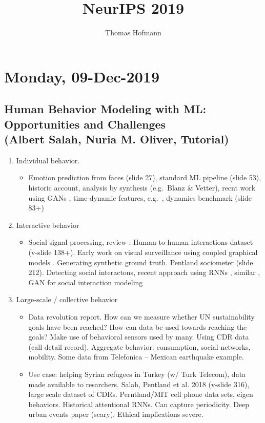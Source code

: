 \documentclass[12pt,a4paper]{article}
\author{Thomas Hofmann}
\title{NeurIPS 2019}
\begin{document}
\maketitle

\section{Monday, 09-Dec-2019}

\subsection{Human Behavior Modeling with ML: Opportunities and Challenges \\ (Albert Salah, Nuria M. Oliver, Tutorial)}
\begin{enumerate}
\item Individual behavior. 
\begin{itemize}
\item Emotion prediction from faces (slide 27), standard ML pipeline (slide 53), historic account,  analysis by synthesis (e.g.~Blanz \& Vetter), recnt work using GANs \cite{ding2018exprgan}, time-dynamic features, e.g.~\cite{otberdout2019automatic}, dynamics benchmark (slide 83+)
\end{itemize}
\item Interactive behavior 
\begin{itemize}
\item Social signal processing, review \cite{vinciarelli2009social}. Human-to-human interactions dataset (v-slide 138+). Early work on visual surveillance using coupled graphical models \cite{oliver2000bayesian}. Generating synthetic ground truth. Pentland sociometer (slide 212). Detecting social interactons, recent approach using RNNs \cite{deng2016structure}, similar \cite{ibrahim2016hierarchical}, GAN for social interaction modeling \cite{gupta2018social} 
\end{itemize}
\item Large-scale / collective behavior 
\begin{itemize}
\item Data revolution report. How can we measure whether UN sustainability goals have been reached? How can data be used towards reaching the goals? Make use of behavioral sensors used by many. Using CDR data (call detail record). Aggregate behavior: consumption, social networks, mobility. Some data from Telefonica -- Mexican earthquake example. 
\item Use case: helping Syrian refugees in Turkey (w/ Turk Telecom), data made available to resarchers. Salah, Pentland et al. 2018 (v-slide 316), large scale dataset of CDRs. Perntland/MIT cell phone data sets, eigen behaviors. Historical attentional  RNNs. Can capture periodicity.  Deep urban events paper (scary). Ethical implications severe.

\end{itemize}
\end{enumerate}
\end{document}
